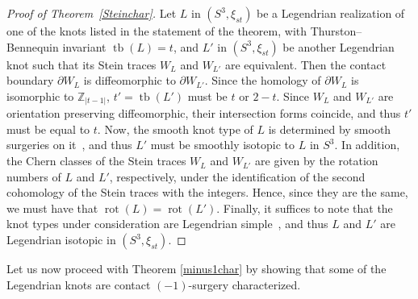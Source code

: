 \documentclass[11pt]{amsart} %
\DeclareMathOperator{\tb}{tb}
\DeclareMathOperator{\rot}{rot}
\newcommand{\Z}{\mathbb{Z}}
\theoremstyle{plain}
\theoremstyle{definition}
\begin{document}
\begin{proof}[Proof of Theorem~\ref{Steinchar}]
	Let $L$ in $(S^3,\xi_{st})$ be a Legendrian realization of one of the knots listed in the statement of the theorem, with Thurston--Bennequin invariant $\tb(L)=t$, and $L'$ in $(S^3,\xi_{st})$ be another Legendrian knot such that its Stein traces $W_L$ and $W_{L'}$ are equivalent. Then the contact boundary $\partial W_L$ is diffeomorphic to $\partial W_{L'}$. Since the homology of $\partial W_L$ is isomorphic to $\Z_{|t-1|}$, $t'=\tb(L')$ must be $t$ or $2-t$. Since $W_L$ and $W_{L'}$ are orientation preserving diffeomorphic, their intersection forms coincide, and thus $t'$ must be equal to $t$. Now, the smooth knot type of $L$ is determined by smooth surgeries on it~\cite{KronheimerMrowkaOzsvathSzabo07, OzsvathSzabo19}, and thus $L'$ must be smoothly isotopic to $L$ in $S^3$. In addition, the Chern classes of the Stein traces $W_L$ and $W_{L'}$ are given by the rotation numbers of $L$ and $L'$, respectively, under the identification of the second cohomology of the Stein traces with the integers. Hence, since they are the same, we must have that $\rot(L)=\rot(L')$. Finally, it suffices to note that the knot types under consideration are Legendrian simple~\cite{EliashbergFraser98, EtnyreHonda01b}, and thus $L$ and $L'$ are Legendrian isotopic in $(S^3,\xi_{st})$. 
\end{proof}

Let us now proceed with Theorem \ref{minus1char} by showing that some of the Legendrian knots are contact $(-1)$-surgery characterized.
\end{document}
